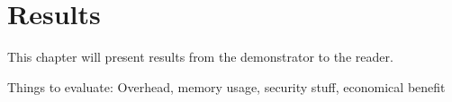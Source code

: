 \chapter{Results}
\label{sec:results}

This chapter will present results from the demonstrator to the reader.

Things to evaluate: Overhead, memory usage, security stuff, economical benefit
